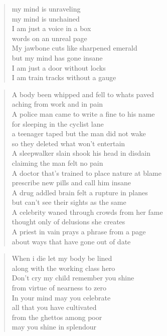 \documentclass[12pt,a4paper]{article}
\begin{document}
\begin{verse}
my mind is unraveling \\
my mind is unchained \\
I am just a voice in a box\\
words on an unreal page\\
My jawbone cuts like sharpened emerald\\
but my mind has gone insane\\
I am just a door without locks\\
I am train tracks without a gauge\\
\end{verse}
\begin{verse}
A body been whipped and fell to whats paved \\
aching from work and in pain \\
A police man came to write a fine to his name \\
for sleeping in the cyclist lane \\
a teenager taped but the man did not wake\\
so they deleted what won't entertain\\
A sleepwalker slain shook his head in disdain\\
claiming the man felt no pain\\
A doctor that's trained to place nature at blame\\
prescribe new pills and call him insane\\
A drug addled brain felt a rupture in planes\\
but can't see their sights as the same\\
A celebrity waned through crowds from her fame\\
thought only of delusions she creates\\
A priest in vain prays a phrase from a page \\
about ways that have gone out of date \\
\end{verse}
\newpage
\begin{verse}
When i die let my body be lined \\
along with the working class hero \\
Don't cry my child remember you shine \\
from virtue of nearness to zero \\
In your mind may you celebrate \\
all that you have cultivated\\
from the ghettos among poor \\
may you shine in splendour\\
\end{verse}
\end{document}
